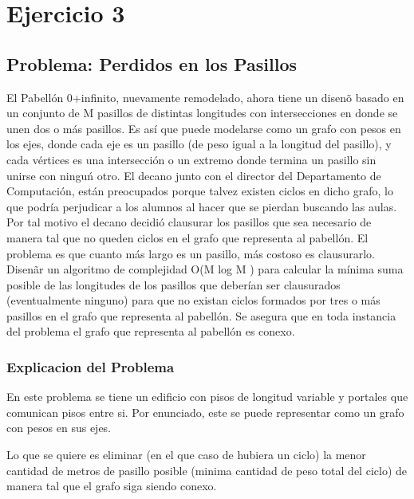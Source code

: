 \section{Ejercicio 3}

\subsection{Problema: Perdidos en los Pasillos}
El Pabell\'on 0+infinito, nuevamente remodelado, ahora tiene un disen\~o basado en un conjunto de M pasillos de distintas longitudes con intersecciones en donde se unen dos o m\'as pasillos. Es as\'i que puede modelarse como un grafo con pesos en los ejes, donde cada eje es un pasillo (de peso igual a la longitud del pasillo), y cada v\'ertices es una intersecci\'on o un extremo donde termina un pasillo sin unirse con ningu\'n otro. El decano junto con el director del Departamento de Computaci\'on, est\'an preocupados porque talvez existen ciclos en dicho grafo, lo que podr\'ia perjudicar a los alumnos al hacer que se pierdan buscando las aulas. Por tal motivo el decano decidi\'o clausurar los pasillos que sea necesario de manera tal que no queden ciclos en el grafo que representa al pabell\'on. El problema es que cuanto m\'as largo es un pasillo, m\'as costoso es clausurarlo. Disen\~ar un algoritmo de complejidad O(M log M ) para calcular la m\'inima suma posible de las longitudes de los pasillos que deber\'ian ser clausurados (eventualmente ninguno) para que no existan ciclos formados por tres o m\'as pasillos en el grafo que representa al pabell\'on. Se asegura que en toda instancia del problema el grafo que representa al pabell\'on es conexo.

\subsubsection{Explicacion del Problema}

    En este problema se tiene un edificio con pisos de longitud variable y portales que comunican pisos entre si. Por enunciado, este se puede representar como un grafo con pesos en sus ejes.
    
        
        
    Lo que se quiere es eliminar (en el que caso de hubiera un ciclo) la menor cantidad de metros de pasillo posible (minima cantidad de peso total del ciclo) de manera tal que el grafo siga siendo conexo.
    
